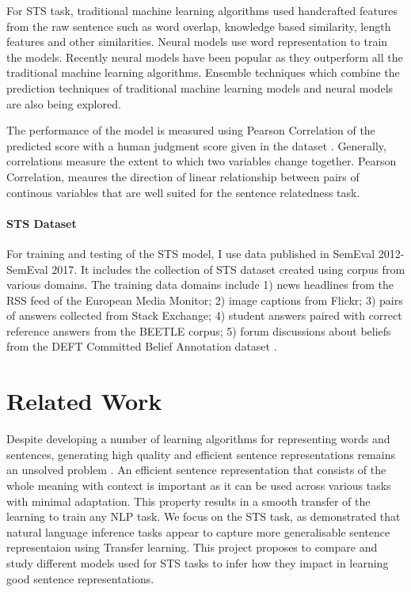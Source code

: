 \documentclass[12pt]{report} %
\begin{document}
For STS task, traditional machine learning algorithms used handcrafted features from the raw sentence such as word overlap, knowledge based similarity, length features and other similarities. Neural models use word representation to train the models. Recently neural models \cite{conneau2017supervised} \citealp{kiros2015skip} \cite{shao2017hcti} have been popular as they outperform all the traditional machine learning algorithms. Ensemble techniques which combine the prediction techniques of traditional machine learning models and neural models are also being explored.


The performance of the model is measured using Pearson Correlation of the predicted score with a human judgment score given in the dataset \citep{agirre2015semeval}. Generally, correlations measure the extent to which two variables change together. Pearson Correlation, meaures the direction of linear relationship between pairs of continous variables that are well suited for the sentence relatedness task.

\subsubsection{STS Dataset}

For training and testing of the STS model, I use data published in SemEval 2012-SemEval 2017. It includes the collection of STS dataset created using corpus from various domains. The training data domains include 1) news headlines from the RSS feed of the European Media Monitor; 2) image captions from Flickr; 3) pairs of answers collected from Stack Exchange; 4) student answers paired with correct reference answers from the BEETLE corpus; 5) forum discussions about beliefs from the DEFT Committed Belief Annotation dataset \citep{agirre2015semeval}. 


\chapter{Related Work}


Despite developing a number of learning algorithms for representing words and sentences, generating high quality and efficient sentence representations remains an unsolved problem \citep{conneau2017supervised}. An efficient sentence representation that consists of the whole meaning with context is important as it can be used across various tasks with minimal adaptation. This property results in a smooth transfer of the learning to train any NLP task. We focus on the STS task, as \cite{conneau2017supervised} demonstrated that natural language inference tasks appear to capture more generalisable sentence representaion using Transfer learning. This project proposes to compare and study different models used for STS tasks to infer how they impact in learning good sentence representations.
\end{document}
